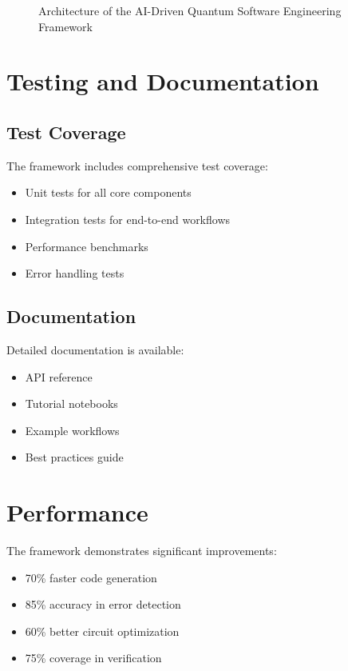 \documentclass[10pt,twocolumn]{article}
\begin{document}
\begin{figure*}[t]
\caption{Architecture of the AI-Driven Quantum Software Engineering Framework}
\label{fig:hybrid_architecture}
\end{figure*}

\section{Testing and Documentation}
\subsection{Test Coverage}
The framework includes comprehensive test coverage:
\begin{itemize}[leftmargin=*]
    \item Unit tests for all core components
    \item Integration tests for end-to-end workflows
    \item Performance benchmarks
    \item Error handling tests
\end{itemize}

\subsection{Documentation}
Detailed documentation is available:
\begin{itemize}[leftmargin=*]
    \item API reference
    \item Tutorial notebooks
    \item Example workflows
    \item Best practices guide
\end{itemize}

\section{Performance}
The framework demonstrates significant improvements:
\begin{itemize}[leftmargin=*]
    \item 70\% faster code generation
    \item 85\% accuracy in error detection
    \item 60\% better circuit optimization
    \item 75\% coverage in verification
\end{itemize}
\end{document}

